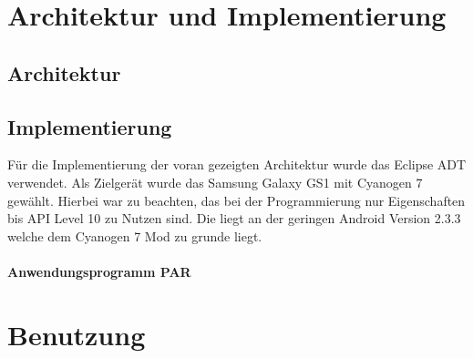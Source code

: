 \documentclass[]{report}
\begin{document}
\chapter{Architektur und Implementierung}
\section{Architektur}
\section{Implementierung}
Für die Implementierung der voran gezeigten Architektur wurde das Eclipse ADT verwendet. Als Zielgerät wurde das Samsung Galaxy GS1 mit Cyanogen 7 gewählt. Hierbei war zu beachten, das bei der Programmierung nur Eigenschaften bis API Level 10 zu Nutzen sind. Die liegt an der geringen Android Version 2.3.3 welche dem Cyanogen 7 Mod zu grunde liegt. \\
\subsubsection{Anwendungsprogramm PAR}

\chapter{Benutzung}
\end{document}
